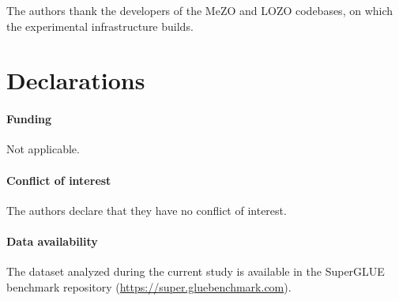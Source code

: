 \documentclass[smallextended]{svjour3}
\begin{document}
\begin{acknowledgements}
The authors thank the developers of the MeZO and LOZO codebases, on which the experimental infrastructure builds.
\end{acknowledgements}

\section*{Declarations}
\paragraph{Funding} Not applicable.
\paragraph{Conflict of interest} The authors declare that they have no conflict of interest.
\paragraph{Data availability} The dataset analyzed during the current study is available in the SuperGLUE benchmark repository (\url{https://super.gluebenchmark.com}).



\end{document}
